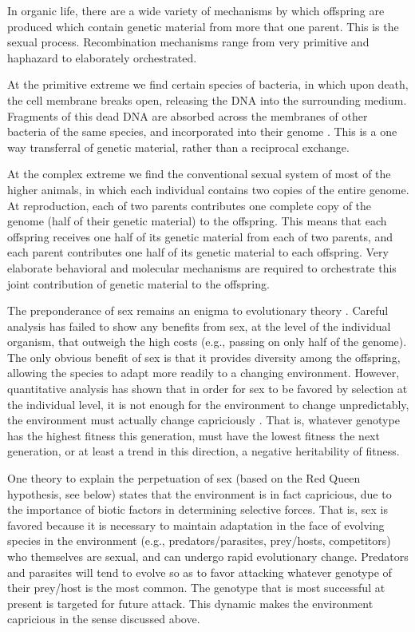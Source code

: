 In organic life, there are a wide variety of mechanisms by which
offspring are produced which contain genetic material from more
that one parent.  This is the sexual process.  Recombination
mechanisms range from very primitive and haphazard to elaborately
orchestrated.

At the primitive extreme we find certain species of bacteria, in which
upon death, the cell membrane breaks open, releasing the DNA into the
surrounding medium.  Fragments of this dead DNA are absorbed across the
membranes of other bacteria of the same species, and incorporated into
their genome \cite{Mayn}.  This is a one way transferral of genetic
material, rather than a reciprocal exchange.

At the complex extreme we find the conventional sexual system of most of
the higher animals, in which each individual contains two copies of the
entire genome.  At reproduction, each of two parents contributes one
complete copy of the genome (half of their genetic material) to the
offspring.  This means that each offspring receives one half of its
genetic material from each of two parents, and each parent contributes
one half of its genetic material to each offspring.  Very elaborate
behavioral and molecular mechanisms are required to orchestrate this
joint contribution of genetic material to the offspring.

The preponderance of sex remains an enigma to evolutionary theory
\cite{Bell,Ghis,Halv,Hapg,Marg,Mich,Stea,Will}.
Careful analysis has failed to show any benefits from sex, at the
level of the individual organism,
that outweigh the high costs (e.g., passing on only half of the genome).
The only obvious benefit of sex is that it provides diversity among the
offspring, allowing the species to adapt more readily to a changing
environment.  However, quantitative analysis has shown that in order
for sex to be favored by selection at the individual level, it is not
enough for the environment to change unpredictably, the environment must
actually change capriciously \cite{Char,MaSm71}.  That is, whatever
genotype has the highest fitness this generation, must have the
lowest fitness the next generation, or at least a trend in this
direction, a negative heritability of fitness.

One theory to explain the perpetuation of sex (based on the Red Queen
hypothesis, see below) states that the environment is in fact capricious,
due to the importance of biotic factors in determining selective forces.
That is, sex is favored because it is necessary to maintain adaptation
in the face of evolving species in the environment (e.g.,
predators/parasites, prey/hosts, competitors) who themselves are
sexual, and can undergo rapid evolutionary change.  Predators and
parasites will tend to evolve so as to favor attacking whatever
genotype of their prey/host is the most common.  The genotype that
is most successful at present is targeted for future attack.  This
dynamic makes the environment capricious in the sense discussed above.

